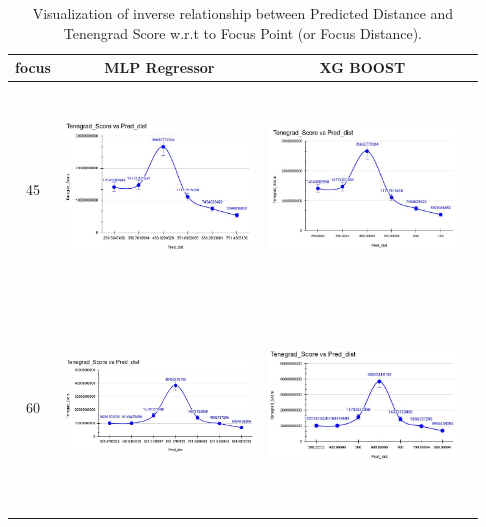 \documentclass[sn-mathphys]{sn-jnl}%
\theoremstyle{thmstyleone}%
\theoremstyle{thmstyletwo}%
\theoremstyle{thmstylethree}%
\begin{document}
\begin{table}[!htbp]
\caption{Visualization of inverse relationship between Predicted Distance and Tenengrad Score w.r.t to Focus Point (or Focus Distance).} 
\label{tab:modelinv2}
\centering 
\begin{tabular}{ c c c c }\hline  
focus&MLP Regressor& XG BOOST \\
\hline
\hline
45&  \includegraphics[width=5cm,height=5.5cm]{mlp45.JPG} &
\includegraphics[width=5cm,height=5.5cm]{xgb45.JPG}\\
\hline
60  & \includegraphics[width=5cm,height=5.5cm]{mlp60.JPG}  &
\includegraphics[width=5cm,height=5.5cm]{xgb60.JPG}\\

\end{tabular}
\end{table}
\end{document}
